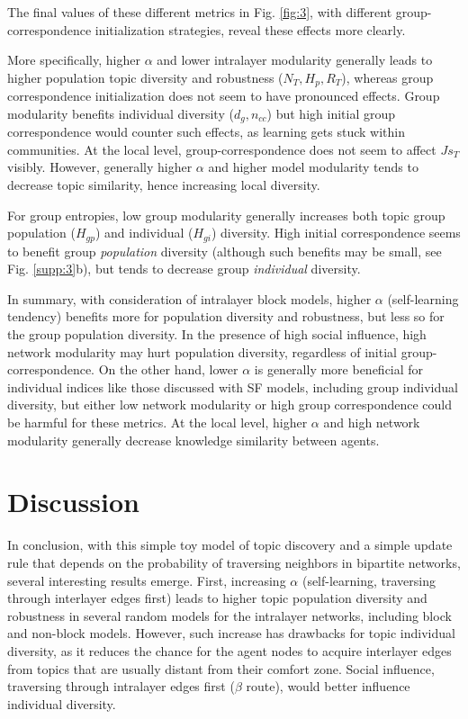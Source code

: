 \documentclass{svproc}
\begin{document}
The final values of these different metrics in Fig. \ref{fig:3}, with different group-correspondence initialization strategies, reveal these effects more clearly.

More specifically,
    higher $\alpha$ and lower intralayer modularity generally leads to higher population topic diversity and robustness ($N_T, H_p, R_T$),
    whereas group correspondence initialization does not seem to have pronounced effects.
Group modularity
    benefits individual diversity ($d_g, n_{cc}$)
    but high initial group correspondence would counter such effects, as learning gets stuck within communities.
At the local level, group-correspondence does not seem to affect $Js_T$ visibly.
However, generally higher $\alpha$ and higher model modularity tends to decrease topic similarity, hence increasing local diversity.

For group entropies, low group modularity generally increases both topic group population ($H_{gp}$) and individual ($H_{gi}$) diversity.
High initial correspondence
    seems to benefit group \textit{population} diversity (although such benefits may be small, see Fig. \ref{supp:3}b),
    but tends to decrease group \textit{individual} diversity.

In summary,
    with consideration of intralayer block models,
    higher $\alpha$ (self-learning tendency) benefits more for population diversity and robustness,
    but less so for the group population diversity.
In the presence of high social influence,
    high network modularity may hurt population diversity,
    regardless of initial group-correspondence.
On the other hand,
    lower $\alpha$ is generally more beneficial for individual indices like those discussed with SF models,
    including group individual diversity,
    but either low network modularity or high group correspondence could be harmful for these metrics.
At the local level, higher $\alpha$ and high network modularity generally decrease knowledge similarity between agents.

\section{Discussion}

In conclusion,
    with this simple toy model of topic discovery
    and a simple update rule that depends on the probability of traversing neighbors in bipartite networks,
    several interesting results emerge.
First,
    increasing $\alpha$ (self-learning, traversing through interlayer edges first)
    leads to higher topic population diversity and robustness
    in several random models for the intralayer networks,
    including block and non-block models.
However,
    such increase has drawbacks for topic individual diversity,
    as it reduces the chance for the agent nodes to acquire interlayer edges from topics that are usually distant from their comfort zone.
Social influence, traversing through intralayer edges first ($\beta$ route),
    would better influence individual diversity.
\end{document}
